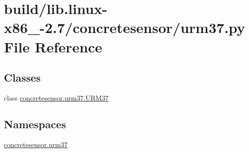 \hypertarget{build_2lib_8linux-x86__64-2_87_2concretesensor_2urm37_8py}{}\section{build/lib.linux-\/x86\+\_-\/2.7/concretesensor/urm37.py File Reference}
\label{build_2lib_8linux-x86__64-2_87_2concretesensor_2urm37_8py}
\subsection*{Classes}
\begin{DoxyCompactItemize}
\item 
class \hyperlink{classconcretesensor_1_1urm37_1_1URM37}{concretesensor.\+urm37.\+U\+R\+M37}
\end{DoxyCompactItemize}
\subsection*{Namespaces}
\begin{DoxyCompactItemize}
\item 
 \hyperlink{namespaceconcretesensor_1_1urm37}{concretesensor.\+urm37}
\end{DoxyCompactItemize}
